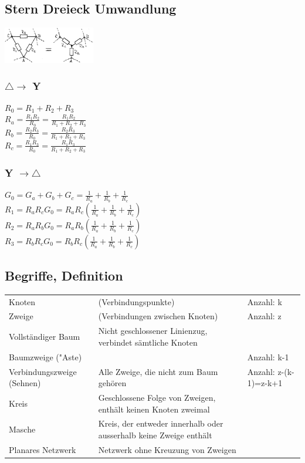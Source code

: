 \subsection{Stern Dreieck Umwandlung}
\begin{multicols}{3}
\includegraphics[width=0.3\textwidth]{pics/stern-dreieck}
\subsubsection{$ \triangle \rightarrow $ Y}
$ R_0 = R_1 + R_2 + R_3 $ \\
$ R_a = \frac{R_1R_2}{R_0} = \frac{R_1R_2}{R_1 + R_2 + R_3} $ \\[1pt]
$ R_b = \frac{R_2R_3}{R_0} = \frac{R_2R_3}{R_1 + R_2 + R_3} $ \\[1pt]
$ R_c = \frac{R_1R_3}{R_0} = \frac{R_1R_3}{R_1 + R_2 + R_3} $ \\
\subsubsection{Y $ \rightarrow \triangle $}
$ G_0 = G_a + G_b + G_c = \frac{1}{R_a} + \frac{1}{R_b} + \frac{1}{R_c} $ \\
$ R_1 = R_aR_cG_0 = R_aR_c(\frac{1}{R_a} + \frac{1}{R_b} + \frac{1}{R_c}) $ \\
$ R_2 = R_aR_bG_0 = R_aR_b(\frac{1}{R_a} + \frac{1}{R_b} + \frac{1}{R_c}) $ \\
$ R_3 = R_bR_cG_0 = R_bR_c(\frac{1}{R_a} + \frac{1}{R_b} + \frac{1}{R_c}) $ \\
\end{multicols}

\subsection{Begriffe, Definition}
\begin{tabular}{lll}
Knoten & (Verbindungspunkte) & Anzahl: k \\
Zweige & (Verbindungen zwischen Knoten) & Anzahl: z \\
Vollständiger Baum & Nicht geschlossener Linienzug, verbindet sämtliche Knoten& \\
Baumzweige ("Aste) & &  Anzahl: k-1\\
Verbindungszweige (Sehnen) & Alle Zweige, die nicht zum Baum gehören & Anzahl: z-(k-1)=z-k+1\\
Kreis & Geschlossene Folge von Zweigen, enthält keinen Knoten zweimal & \\
Masche & Kreis, der entweder innerhalb oder ausserhalb keine Zweige enthält & \\
Planares Netzwerk & Netzwerk ohne Kreuzung von Zweigen & \\
\end{tabular}

